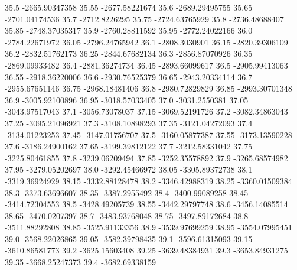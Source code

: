            35.5   -2665.90347358
          35.55   -2677.58221674
           35.6   -2689.29495755
          35.65   -2701.04174536
           35.7    -2712.8226295
          35.75   -2724.63765929
           35.8   -2736.48688407
          35.85   -2748.37035317
           35.9   -2760.28811592
          35.95   -2772.24022166
           36.0   -2784.22671972
          36.05   -2796.24765942
           36.1    -2808.3030901
          36.15   -2820.39306109
           36.2   -2832.51762173
          36.25   -2844.67682134
           36.3   -2856.87070926
          36.35   -2869.09933482
           36.4   -2881.36274734
          36.45   -2893.66099617
           36.5   -2905.99413063
          36.55   -2918.36220006
           36.6   -2930.76525379
          36.65   -2943.20334114
           36.7   -2955.67651146
          36.75   -2968.18481406
           36.8   -2980.72829829
          36.85   -2993.30701348
           36.9   -3005.92100896
          36.95   -3018.57033405
           37.0    -3031.2550381
          37.05   -3043.97517043
           37.1   -3056.73078037
          37.15   -3069.52191726
           37.2   -3082.34863043
          37.25   -3095.21096921
           37.3   -3108.10898293
          37.35   -3121.04272093
           37.4   -3134.01223253
          37.45   -3147.01756707
           37.5   -3160.05877387
          37.55   -3173.13590228
           37.6   -3186.24900162
          37.65   -3199.39812122
           37.7   -3212.58331042
          37.75   -3225.80461855
           37.8   -3239.06209494
          37.85   -3252.35578892
           37.9   -3265.68574982
          37.95   -3279.05202697
           38.0   -3292.45466972
          38.05   -3305.89372738
           38.1   -3319.36924929
          38.15   -3332.88128478
           38.2   -3346.42988319
          38.25   -3360.01509384
           38.3   -3373.63696607
          38.35    -3387.2955492
           38.4   -3400.99089258
          38.45   -3414.72304553
           38.5   -3428.49205739
          38.55   -3442.29797748
           38.6   -3456.14085514
          38.65    -3470.0207397
           38.7   -3483.93768048
          38.75   -3497.89172684
           38.8   -3511.88292808
          38.85   -3525.91133356
           38.9   -3539.97699259
          38.95   -3554.07995451
           39.0   -3568.22026865
          39.05   -3582.39798435
           39.1   -3596.61315093
          39.15   -3610.86581773
           39.2   -3625.15603408
          39.25   -3639.48384931
           39.3   -3653.84931275
          39.35   -3668.25247373
           39.4   -3682.69338159
